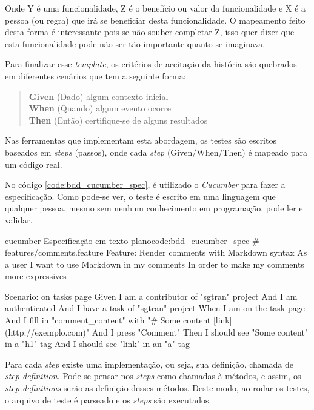 Onde Y é uma funcionalidade, Z é o benefício ou valor da funcionalidade e X é a pessoa (ou regra) que irá se beneficiar desta funcionalidade. O mapeamento feito desta forma é interessante pois se não souber completar Z, isso quer dizer que esta funcionalidade pode não ser tão importante quanto se imaginava.

Para finalizar esse \textit{template}, os critérios de aceitação da história são quebrados em diferentes cenários que tem a seguinte forma:

\begin{quote}
\textbf{Given} (Dado) algum contexto inicial\\
\textbf{When} (Quando) algum evento ocorre\\
\textbf{Then} (Então) certifique-se de alguns resultados
\end{quote}

Nas ferramentas que implementam esta abordagem, os testes são escritos baseados em \textit{steps} (passos), onde cada \textit{step} (Given/When/Then) é mapeado para um código real.

No código \ref{code:bdd_cucumber_spec}, é utilizado o \textit{Cucumber} para fazer a especificação. Como pode-se ver, o teste é escrito em uma linguagem que qualquer pessoa, mesmo sem nenhum conhecimento em programação, pode ler e validar.

\begin{mycode}{cucumber}%
{Especificação em texto plano}{code:bdd_cucumber_spec}
# features/comments.feature
Feature: Render comments with Markdown syntax
  As a user
  I want to use Markdown in my comments
  In order to make my comments more expressives

  Scenario: on tasks page
    Given I am a contributor of "sgtran" project
    And I am authenticated
    And I have a task of "sgtran" project
    When I am on the task page
    And I fill in "comment_content" with "# Some content [link](http://exemplo.com)"
    And I press "Comment"
    Then I should see "Some content" in a "h1" tag
    And I should see "link" in an "a" tag
\end{mycode}

Para cada \textit{step} existe uma implementação, ou seja, sua definição, chamada de \textit{step definition}. Pode-se pensar nos \textit{steps} como chamadas à métodos, e assim, os \textit{step definitions} serão as definição desses métodos. Deste modo, ao rodar os testes, o arquivo de teste é parseado e os \textit{steps} são executados.

